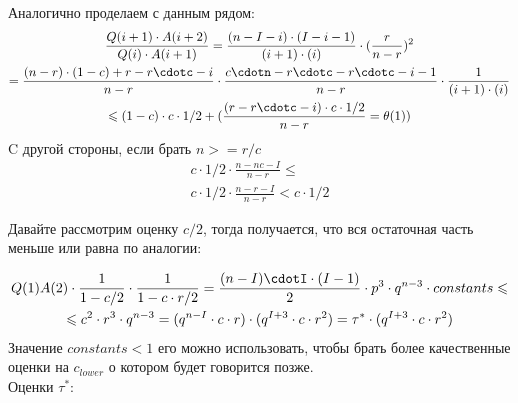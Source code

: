 \documentclass[times,specification,annotation]{itmo-student-thesis}
\begin{document}
    Аналогично проделаем с данным рядом:
    \begin{gather*}
        \frac{Q(i + 1) \cdot A(i + 2)}{Q(i) \cdot A(i + 1)} = \frac{(n - I - i) \cdot (I - i - 1)}{(i + 1) \cdot (i)} \cdot (\frac{r}{n - r})^2 \\
        = \frac{(n - r)\cdot(1 - c) + r - r\cdotc - i}{n - r} \cdot \frac{c\cdotn - r\cdotc - r\cdotc - i - 1}{n - r} \cdot \frac{1}{(i + 1) \cdot (i)} \\
        \leq (1 - c) \cdot c \cdot 1/2 + (\frac{(r - r\cdotc - i) \cdot c \cdot 1/2}{n - r} = \theta(1))
    \end{gather*}
    C другой стороны, если брать $n >= r/c$
    \begin{gather*}
        c \cdot 1/2 \cdot \frac{n - nc - I}{n - r} \leq \\ c \cdot 1/2 \cdot \frac{n - r - I}{n - r} < c \cdot 1/2
    \end{gather*}

    Давайте рассмотрим оценку $c/2$, тогда получается, что вся остаточная часть меньше или равна по аналогии:

    \begin{gather*}
        Q(1)A(2) \cdot \frac{1}{1 - c/2} \cdot \frac{1}{1 - c \cdot r/2} = \frac{(n - I)\cdotI\cdot(I - 1)}{2} \cdot p^3 \cdot q^{n - 3} \cdot constants \leq\\
        \leq c^2 \cdot r^3 \cdot q^{n - 3} = (q^{n - I} \cdot c \cdot r) \cdot  (q^{I + 3} \cdot c \cdot r^2)  = \tau^* \cdot (q^{I + 3} \cdot c \cdot r^2)
    \end{gather*}
    Значение $constants < 1$ его можно использовать, чтобы брать более качественные оценки на $c_{lower}$ о котором будет говорится позже. \\

    Оценки $\tau^*$:
\end{document}

